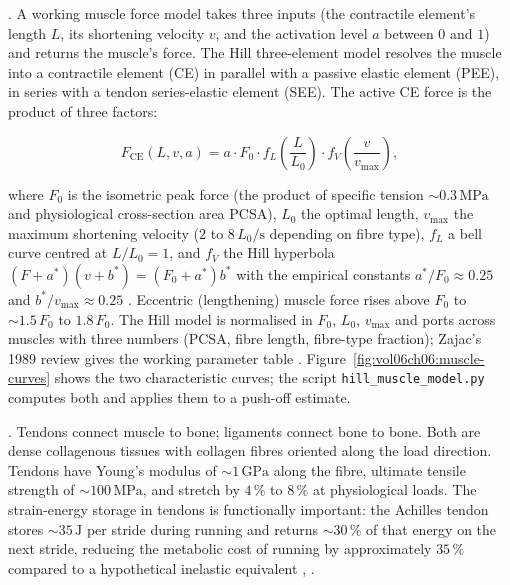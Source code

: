 .
A working muscle force model takes three inputs (the contractile
element's length $L$, its shortening velocity $v$, and the activation
level $a$ between $0$ and $1$) and returns the muscle's force. The
Hill three-element model resolves the muscle into a contractile
element (CE) in parallel with a passive elastic element (PEE), in
series with a tendon series-elastic element (SEE). The active CE
force is the product of three factors:

\[
F_{\text{CE}}(L, v, a) = a \cdot F_0 \cdot f_L\!\left(\frac{L}{L_0}\right)
                       \cdot f_V\!\left(\frac{v}{v_{\max}}\right),
\]

where $F_0$ is the isometric peak force (the product of specific
tension $\sim 0.3\,\text{MPa}$ and physiological cross-section area
PCSA), $L_0$ the optimal length, $v_{\max}$ the maximum shortening
velocity ($2$ to $8\,L_0/\text{s}$ depending on fibre type), $f_L$ a
bell curve centred at $L/L_0 = 1$, and $f_V$ the Hill hyperbola
$(F + a^{*})(v + b^{*}) = (F_0 + a^{*}) b^{*}$ with the empirical
constants $a^{*}/F_0 \approx 0.25$ and $b^{*}/v_{\max} \approx 0.25$
\cite[p.~150]{paper:v6c06-hill-1938}. Eccentric (lengthening) muscle
force rises above $F_0$ to $\sim 1.5\,F_0$ to $1.8\,F_0$. The Hill
model is normalised in $F_0$, $L_0$, $v_{\max}$ and ports across
muscles with three numbers (PCSA, fibre length, fibre-type
fraction); Zajac's 1989 review gives the working parameter table
\cite[Tab.~II]{paper:v6c06-zajac-1989}.
Figure~\ref{fig:vol06ch06:muscle-curves} shows the two characteristic
curves; the script \texttt{hill\_muscle\_model.py} computes both and
applies them to a push-off estimate.



. Tendons connect muscle to bone;
ligaments connect bone to bone. Both are dense collagenous tissues
with collagen fibres oriented along the load direction. Tendons have
Young's modulus of $\sim 1\,\text{GPa}$ along the fibre, ultimate
tensile strength of $\sim 100\,\text{MPa}$, and stretch by $4\,\%$
to $8\,\%$ at physiological loads. The strain-energy storage in
tendons is functionally important: the Achilles tendon stores
$\sim 35\,\text{J}$ per stride during running and returns
$\sim 30\,\%$ of that energy on the next stride, reducing the
metabolic cost of running by approximately $35\,\%$ compared to a
hypothetical inelastic equivalent
\cite[ch.~11]{text:winter-biomechanics-human},
\cite[p.~62]{paper:v6c06-alexander-1991}.

